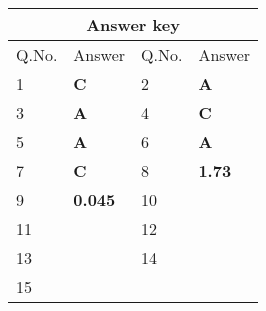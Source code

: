 \begin{table}[H]
	\centering
	\begin{tabular}{|p{1.5cm}|p{1.5cm}||p{1.5cm}|p{1.5cm}|}
		\hline
		\multicolumn{4}{|c|}{\textbf{Answer key}}\\\hline\hline
		\rowcolor{ocrel}Q.No.&Answer&Q.No.&Answer\\\hline
		1&\textbf{C} &2&\textbf{A}\\\hline 
		3&\textbf{A} &4&\textbf{C} \\\hline
		5&\textbf{A} &6&\textbf{A} \\\hline
		7&\textbf{C}&8&\textbf{1.73}\\\hline
		9&\textbf{0.045}&10&\textbf{}\\\hline
		11&\textbf{} &12&\textbf{}\\\hline
		13&\textbf{}&14&\textbf{}\\\hline
		15&\textbf{}& &\\\hline
		
	\end{tabular}
\end{table}
